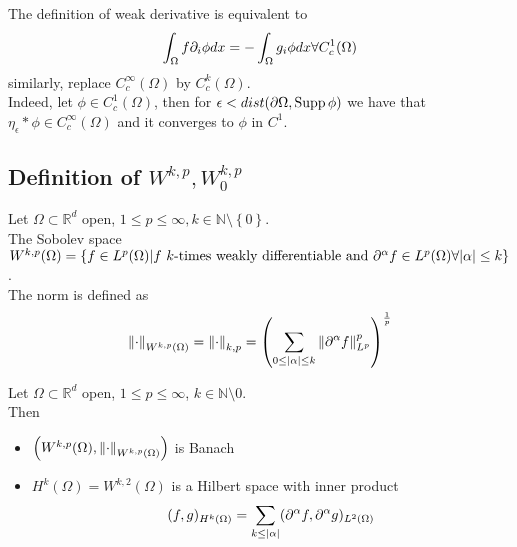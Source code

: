 \documentclass[../main.tex]{subfiles}
\begin{document}
\begin{rmq}
The definition of weak derivative is equivalent to
\[ 
\int_{ \Omega }^{  } f \partial_i \phi dx = - \int_{ \Omega }^{  } g_i \phi dx \forall C^{1}_c( \Omega) 
\]
similarly, replace $ C^{ \infty }_c( \Omega) $ by $C^{k}_c( \Omega) $.\\
Indeed, let $\phi \in C^{1}_c( \Omega) $, then for $\epsilon< dist( \partial\Omega, \operatorname{Supp} \phi) $ we have that $\eta_\epsilon \ast \phi \in C^{ \infty }_c( \Omega) $ and it converges to $\phi$  in $C^{1}$.
\end{rmq}
\subsection{Definition of $W^{k,p}, W^{k,p}_0$ }
\begin{defn}
	Let $\Omega \subset \mathbb{R}^{d}$ open, $1 \leq p \leq  \infty , k \in \mathbb{N}\setminus \left\{ 0 \right\} $.\\
	The Sobolev space $W^{k,p}( \Omega) = \left\{ f\in L^{p}( \Omega) | f \text{ $k$-times weakly differentiable and } \partial^{\alpha}f \in L^{p}( \Omega) \forall |\alpha| \leq k \right\} $.\\
	The norm is defined as
	\[ 
	\left\lVert \cdot\right\rVert _{W^{k,p}( \Omega) } = \left\lVert \cdot\right\rVert _{k,p} = \left( \sum_{0 \leq |\alpha| \leq k}^{ }\left\lVert \partial^{\alpha}f\right\rVert_{L^{p}} ^{p}\right)^{\frac{1}{p}}
	\]
	
\end{defn}
\begin{thm}
	Let $\Omega \subset \mathbb{R}^{d}$ open, $1 \leq p \leq \infty $, $k \in \mathbb{N}\setminus 0$.\\
	Then
	\begin{itemize}
	\item $ \left( W^{k,p}( \Omega) , \left\lVert \cdot\right\rVert _{W^{k,p}( \Omega) } \right) $ is Banach
	\item $H^{k}( \Omega) = W^{k,2}( \Omega) $ is a Hilbert space with inner product
		\[ 
			( f,g)_{H^{k}( \Omega) } = \sum_{k \leq |\alpha|} ( \partial^{\alpha}f, \partial^{\alpha}g)_{L^{2}( \Omega) } 
		\]
		
	\end{itemize}
\end{thm}
\end{document}
